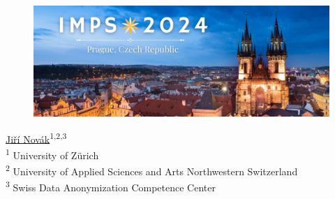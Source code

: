 \documentclass[a0,portrait]{a0poster}
\begin{document}
\begin{figure}[h]
\begin{minipage}{.15\linewidth}
\end{minipage}
\hspace{\fill} %
\begin{minipage}{.24\linewidth}
  \includegraphics[width=20cm]{Poster TEX/style/IMPS.png}
\end{minipage}
\end{figure}

\begin{minipage}[t]{.7\linewidth}
\vfill
\makeatletter
\raggedright{\fontsize{130pt}{100pt}\selectfont\color{uzhblau100}\textbf{{\@title}}\par}
\makeatother
\color{Black}
\vspace{1cm}
\end{minipage}
\begin{minipage}[t]{.3\linewidth}
\vfill
\raggedleft
\Large
\underline{Jiří Novák}\textsuperscript{1,2,3} \\
\vspace{0.2cm}
\large
\textsuperscript{1} University of Zürich \\
\textsuperscript{2} University of Applied Sciences and Arts Northwestern Switzerland  \\
\textsuperscript{3} Swiss Data Anonymization Competence Center
\end{minipage}

\vspace{1cm}
\end{document}
